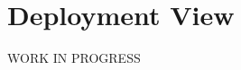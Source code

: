 \documentclass[../../DD.tex]{subfiles}
\begin{document}
\section{Deployment View}
	WORK IN PROGRESS
	
\end{document}
